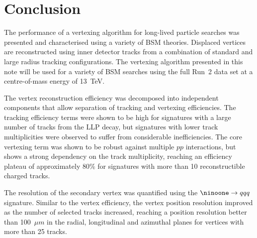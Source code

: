 \documentclass[PUB,UKenglish, texlive=2018]{\ATLASLATEXPATH atlasdoc}
\begin{document}
\FloatBarrier

\clearpage
\section{Conclusion}
\label{sec:conclusion}

The performance of a vertexing algorithm for long-lived particle searches was presented and characterised using a variety of BSM theories.
Displaced vertices are reconstructed using inner detector tracks from a combination of standard  and large radius tracking configurations.
The vertexing algorithm presented in this note will be used for a variety of BSM searches using the full Run~2 data set at a centre-of-mass energy of 13~TeV.

The vertex reconstruction efficiency was decomposed into independent components that allow separation of tracking and vertexing efficiencies.
The tracking efficiency terms were shown to be high for signatures with a large number of tracks from the LLP decay, 
but signatures with lower track multiplicities were observed to suffer from considerable inefficiencies.
The core vertexing term was shown to be robust against multiple $pp$ interactions, but shows  a strong dependency on the track multiplicity,
reaching an efficiency plateau of approximately 80\% for signatures with more than 10 reconstructible charged tracks.

The resolution of the secondary vertex was quantified using the $\ninoone \rightarrow qqq$ signature.
Similar to the vertex efficiency, the vertex position resolution improved as the number of selected tracks increased, 
reaching a position resolution better than 100~$\mu m$ in the radial, longitudinal and azimuthal planes for vertices with more than 25 tracks.

\printbibliography
%
%

\end{document}
